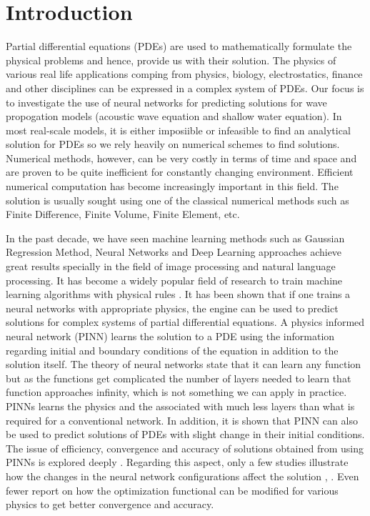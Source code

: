 \section{Introduction}

Partial differential equations (PDEs) are used to mathematically formulate the physical problems and hence, provide us with their solution. The physics of various real life applications comping from physics, biology, electrostatics, finance and other disciplines can be expressed in a complex system of PDEs. Our focus is to investigate the use of neural networks for predicting solutions for wave propogation models (acoustic wave equation and shallow water equation). In most real-scale models, it is either imposiible or infeasible to find an analytical solution for PDEs so we rely heavily on numerical schemes to find solutions. Numerical methods, however, can be very costly in terms of time and space and are proven to be quite inefficient for constantly changing environment. Efficient numerical computation has become increasingly important in this field. The solution is usually sought using one of the classical numerical methods such as Finite Difference, Finite Volume, Finite Element, etc.
\par
\noindent
In the past decade, we have seen machine learning methods such as Gaussian Regression Method, Neural Networks and Deep Learning approaches achieve great results specially in the field of image processing and natural language processing. It has become a widely popular field of research to train machine learning algorithms with physical rules \citep{}. It has been shown \citep{} that if one trains a neural networks with appropriate physics, the engine can be used to predict solutions for complex systems of partial differential equations. A physics informed neural network (PINN) learns the solution to a PDE using the information regarding initial and boundary conditions of the equation in addition to the solution itself. The theory of neural networks state that it can learn any function but as the functions get complicated the number of layers needed to learn that function approaches infinity, which is not something we can apply in practice. PINNs learns the physics and the associated with much less layers than what is required for a conventional network. In addition, it is shown that PINN can also be used to predict solutions of PDEs with slight change in their initial conditions. The issue of efficiency, convergence and accuracy of solutions obtained from using PINNs is explored deeply \citep{}. Regarding this aspect, only a few studies illustrate how the changes in the neural network configurations affect the solution \citep{}, \citep{}. Even fewer report on how the optimization functional can be modified for various physics to get better convergence and accuracy. 
